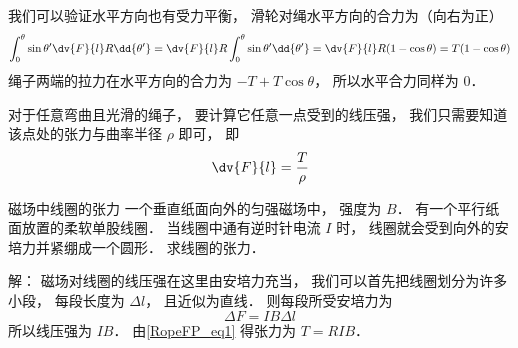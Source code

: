 我们可以验证水平方向也有受力平衡， 滑轮对绳水平方向的合力为（向右为正）
\begin{equation}
\int_0^\theta \sin\theta' \dv{F}{l} R\dd{\theta'}
= \dv{F}{l} R \int_0^\theta \sin\theta' \dd{\theta'}
= \dv{F}{l} R (1 - \cos\theta)
= T(1 - \cos\theta)
\end{equation}
绳子两端的拉力在水平方向的合力为 $-T + T\cos\theta$， 所以水平合力同样为 0．

对于任意弯曲且光滑的绳子， 要计算它任意一点受到的线压强， 我们只需要知道该点处的张力与曲率半径 $\rho$ 即可， 即
\begin{equation}
\dv{F}{l} = \frac{T}{\rho}
\end{equation}

\begin{exam}{磁场中线圈的张力}
一个垂直纸面向外的匀强磁场中， 强度为 $B$． 有一个平行纸面放置的柔软单股线圈． 当线圈中通有逆时针电流 $I$ 时， 线圈就会受到向外的安培力并紧绷成一个圆形． 求线圈的张力．

解： 磁场对线圈的线压强在这里由安培力充当， 我们可以首先把线圈划分为许多小段， 每段长度为 $\Delta l$， 且近似为直线． 则每段所受安培力为
\begin{equation}
\Delta F = IB\Delta l
\end{equation}
所以线压强为 $IB$． 由\autoref{RopeFP_eq1} 得张力为 $T = RIB$．
\end{exam}
